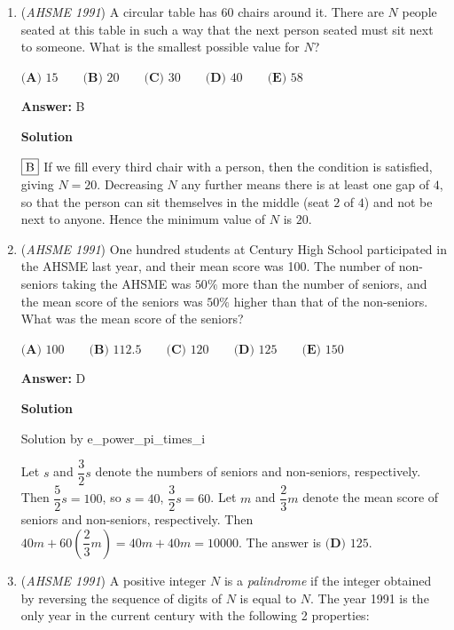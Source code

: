\begin{enumerate}
 


	\item (\textit{AHSME 1991}) A circular table has 60 chairs around it. There are $N$ people seated at this table in such a way that the next person seated must sit next to someone. What is the smallest possible value for $N$?


 $\textbf{(A) } 15\qquad \textbf{(B) } 20\qquad \textbf{(C) } 30\qquad \textbf{(D) } 40\qquad \textbf{(E) } 58$

 \textbf{Answer: }B



\textbf{Solution}

$\fbox{B}$ If we fill every third chair with a person, then the condition is satisfied, giving $N=20$. Decreasing $N$ any further means there is at least one gap of $4$, so that the person can sit themselves in the middle (seat $2$ of $4$) and not be next to anyone. Hence the minimum value of $N$ is $20$.

 


	\item (\textit{AHSME 1991}) One hundred students at Century High School participated in the AHSME last year, and their mean score was 100. The number of non-seniors taking the AHSME was $50\%$ more than the number of seniors, and the mean score of the seniors was $50\%$ higher than that of the non-seniors. What was the mean score of the seniors?


 $\textbf{(A) } 100\qquad \textbf{(B) } 112.5\qquad \textbf{(C) } 120\qquad \textbf{(D) } 125\qquad \textbf{(E) } 150$

 \textbf{Answer: }D



\textbf{Solution}

Solution by e\_power\_pi\_times\_i

 
Let $s$ and $\dfrac{3}{2}s$ denote the numbers of seniors and non-seniors, respectively. Then $\dfrac{5}{2}s = 100$, so $s = 40$, $\dfrac{3}{2}s = 60$. Let $m$ and $\dfrac{2}{3}m$ denote the mean score of seniors and non-seniors, respectively. Then $40m + 60(\dfrac{2}{3}m) = 40m + 40m = 10000$. The answer is $\boxed{\textbf{(D) } 125}$.

 


	\item (\textit{AHSME 1991}) A positive integer $N$ is a \textit{palindrome} if the integer obtained by reversing the sequence of digits of $N$ is equal to $N$. The year 1991 is the only year in the current century with the following 2 properties:



\end{enumerate}
